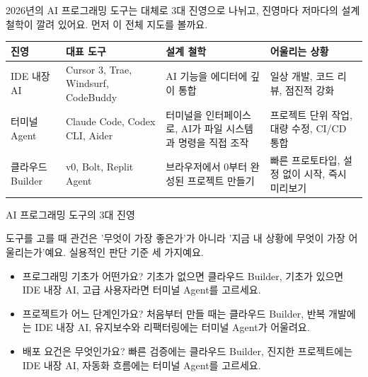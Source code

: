 


2026년의 AI 프로그래밍 도구는 대체로 3대 진영으로 나뉘고, 진영마다 저마다의 설계 철학이 깔려 있어요. 먼저 이 전체 지도를 볼까요.

\begin{center}
\begin{tabularx}{\linewidth}{|X|X|X|X|}
\hline
\textbf{진영} & \textbf{대표 도구} & \textbf{설계 철학} & \textbf{어울리는 상황} \tabularnewline
\hline
IDE 내장 AI & Cursor 3, Trae, Windsurf, CodeBuddy & AI 기능을 에디터에 깊이 통합 & 일상 개발, 코드 리뷰, 점진적 강화 \tabularnewline
터미널 Agent & Claude Code, Codex CLI, Aider & 터미널을 인터페이스로, AI가 파일 시스템과 명령을 직접 조작 & 프로젝트 단위 작업, 대량 수정, CI/CD 통합 \tabularnewline
클라우드 Builder & v0, Bolt, Replit Agent & 브라우저에서 0부터 완성된 프로젝트 만들기 & 빠른 프로토타입, 설정 없이 시작, 즉시 미리보기 \tabularnewline
\hline
\end{tabularx}
\end{center}

\begin{center}\small\color{gray}AI 프로그래밍 도구의 3대 진영\end{center}

도구를 고를 때 관건은 '무엇이 가장 좋은가'가 아니라 '지금 내 상황에 무엇이 가장 어울리는가'예요. 실용적인 판단 기준 세 가지예요.

\begin{itemize}
  \item 프로그래밍 기초가 어떤가요? 기초가 없으면 클라우드 Builder, 기초가 있으면 IDE 내장 AI, 고급 사용자라면 터미널 Agent를 고르세요.
  \item 프로젝트가 어느 단계인가요? 처음부터 만들 때는 클라우드 Builder, 반복 개발에는 IDE 내장 AI, 유지보수와 리팩터링에는 터미널 Agent가 어울려요.
  \item 배포 요건은 무엇인가요? 빠른 검증에는 클라우드 Builder, 진지한 프로젝트에는 IDE 내장 AI, 자동화 흐름에는 터미널 Agent를 고르세요.
\end{itemize}

